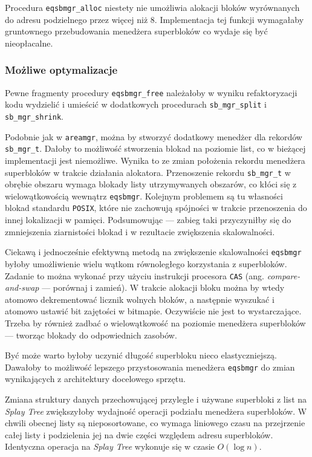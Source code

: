 \documentclass[12pt,a4paper,titlepage,twoside]{mwart}
\begin{document}
Procedura \verb+eqsbmgr_alloc+ niestety nie umożliwia alokacji bloków
wyrównanych do adresu podzielnego przez więcej niż 8. Implementacja tej funkcji
wymagałaby gruntownego przebudowania menedżera superbloków co wydaje się być
nieopłacalne.

\subsubsection{Możliwe optymalizacje}

Pewne fragmenty procedury \verb+eqsbmgr_free+ należałoby w wyniku
refaktoryzacji kodu wydzielić i umieścić w dodatkowych procedurach
\verb+sb_mgr_split+ i \verb+sb_mgr_shrink+.

Podobnie jak w \texttt{areamgr}, można by stworzyć dodatkowy menedżer dla
rekordów \verb+sb_mgr_t+. Dałoby to możliwość stworzenia blokad na poziomie
list, co w bieżącej implementacji jest niemożliwe. Wynika to ze zmian
położenia rekordu menedżera superbloków w trakcie działania alokatora.
Przenoszenie rekordu \verb+sb_mgr_t+ w obrębie obszaru wymaga blokady listy
utrzymywanych obszarów, co kłóci się z wielowątkowością wewnątrz
\texttt{eqsbmgr}. Kolejnym problemem są tu własności blokad standardu
\texttt{POSIX}, które nie zachowują spójności w trakcie przenoszenia do innej
lokalizacji w pamięci. Podsumowując --- zabieg taki przyczyniłby się do
zmniejszenia ziarnistości blokad i w rezultacie zwiększenia skalowalności.

Ciekawą i jednocześnie efektywną metodą na zwiększenie skalowalności
\texttt{eqsbmgr} byłoby umożliwienie wielu wątkom równoległego korzystania z
superbloków.  Zadanie to można wykonać przy użyciu instrukcji procesora
\verb+CAS+ (ang. \textit{compare-and-swap} --- porównaj i zamień).  W trakcie
alokacji bloku można by wtedy atomowo dekrementować licznik wolnych bloków, a
następnie wyszukać i atomowo ustawić bit zajętości w bitmapie. Oczywiście nie
jest to wystarczające. Trzeba by również zadbać o wielowątkowość na poziomie
menedżera superbloków --- tworząc blokady do odpowiednich zasobów.

Być może warto byłoby uczynić długość superbloku nieco elastyczniejszą.
Dawałoby to możliwość lepszego przystosowania menedżera \texttt{eqsbmgr} do
zmian wynikających z architektury docelowego sprzętu.

Zmiana struktury danych przechowującej przyległe i używane superbloki z list na
\textit{Splay Tree} zwiększyłoby wydajność operacji podziału menedżera
superbloków. W chwili obecnej listy są nieposortowane, co wymaga liniowego
czasu na przejrzenie całej listy i podzielenia jej na dwie części względem
adresu superbloków. Identyczna operacja na \textit{Splay Tree} wykonuje się w
czasie $O(\log n)$.
\end{document}
